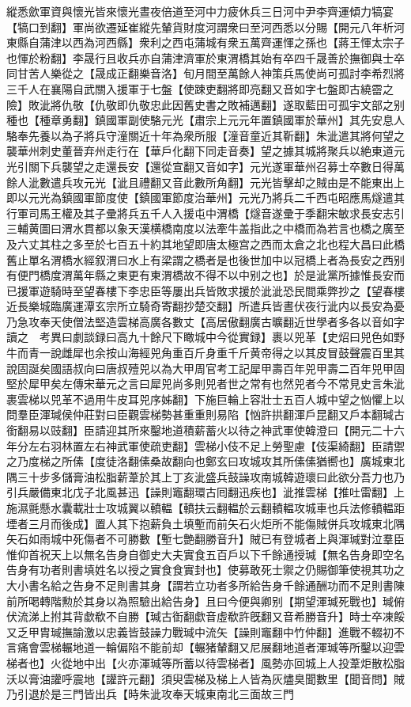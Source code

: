 縱悉歛軍資與懷光皆來懷光晝夜倍道至河中力疲休兵三日河中尹李齊運傾力犒宴【犒口到翻】軍尚欲遷延崔縱先輦貨財度河謂衆曰至河西悉以分賜【開元八年析河東縣自蒲津以西為河西縣】衆利之西屯蒲城有衆五萬齊運惲之孫也【蔣王惲太宗子也惲於粉翻】李晟行且收兵亦自蒲津濟軍於東渭橋其始有卒四千晟善於撫御與士卒同甘苦人樂從之【晟成正翻樂音洛】旬月間至萬餘人神策兵馬使尚可孤討李希烈將三千人在襄陽自武關入援軍于七盤【使踈吏翻將即亮翻又音如字七盤即古繞霤之險】敗泚將仇敬【仇敬即仇敬忠此因舊史書之敗補邁翻】遂取藍田可孤宇文部之别種也【種章勇翻】鎮國軍副使駱元光【肅宗上元元年置鎮國軍於華州】其先安息人駱奉先養以為子將兵守潼關近十年為衆所服【潼音童近其靳翻】朱泚遣其將何望之襲華州刺史董晉弃州走行在【華戶化翻下同走音奏】望之據其城將聚兵以絶東道元光引關下兵襲望之走還長安【還從宣翻又音如字】元光遂軍華州召募士卒數日得萬餘人泚數遣兵攻元光【泚且禮翻又音此數所角翻】元光皆擊却之賊由是不能東出上即以元光為鎮國軍節度使【鎮國軍節度治華州】元光乃將兵二千西屯昭應馬燧遣其行軍司馬王權及其子彚將兵五千人入援屯中渭橋【燧音遂彚于季翻宋敏求長安志引三輔黄圖曰渭水貫都以象天漢横橋南度以法牽牛盖指此之中橋而為若言也橋之廣至及六丈其柱之多至於七百五十約其地望即唐太極宫之西而太倉之北也程大昌曰此橋舊止單名渭橋水經叙渭曰水上有梁謂之橋者是也後世加中以冠橋上者為長安之西别有便門橋度渭萬年縣之東更有東渭橋故不得不以中别之也】於是泚黨所據惟長安而已援軍遊騎時至望春樓下李忠臣等屢出兵皆敗求援於泚泚恐民間乘弊抄之【望春樓近長樂城臨廣運潭玄宗所立騎奇寄翻抄楚交翻】所遣兵皆晝伏夜行泚内以長安為憂乃急攻奉天使僧法堅造雲梯高廣各數丈【高居傲翻廣古曠翻近世學者多各以音如字讀之　考異曰劇談録曰高九十餘尺下瞰城中今從實録】裹以兕革【史炤曰兕色如野牛而青一說雌犀也余按山海經兕角重百斤身重千斤黄帝得之以其皮冒鼓聲震百里其說固誕矣國語叔向曰唐叔殪兕以為大甲周官考工記犀甲壽百年兕甲壽二百年兕甲固堅於犀甲矣左傳宋華元之言曰犀兕尚多則兕者世之常有也然兕者今不常見史言朱泚裹雲梯以兕革不過用牛皮耳兕序姊翻】下施巨輪上容壯士五百人城中望之忷懼上以問羣臣渾瑊侯仲莊對曰臣觀雲梯勢甚重重則易陷【忷許拱翻渾戶昆翻又戶本翻瑊古銜翻易以豉翻】臣請迎其所來鑿地道積薪蓄火以待之神武軍使韓澄曰【開元二十六年分左右羽林置左右神武軍使疏吏翻】雲梯小伎不足上勞聖慮【伎渠綺翻】臣請禦之乃度梯之所傃【度徒洛翻傃桑故翻向也鄭玄曰攻城攻其所傃傃猶嚮也】廣城東北隅三十步多儲膏油松脂薪葦於其上丁亥泚盛兵鼓譟攻南城韓遊瓌曰此欲分吾力也乃引兵嚴備東北戊子北風甚迅【譟則竈翻環古囘翻迅疾也】泚推雲梯【推吐雷翻】上施濕氈懸水囊載壯士攻城翼以轒輼【轒扶云翻輼於云翻轒輼攻城車也兵法修轒輼距堙者三月而後成】置人其下抱薪負土填塹而前矢石火炬所不能傷賊併兵攻城東北隅矢石如雨城中死傷者不可勝數【塹七艶翻勝音升】賊已有登城者上與渾瑊對泣羣臣惟仰首祝天上以無名告身自御史大夫實食五百戶以下千餘通授瑊【無名告身即空名告身有功者則書填姓名以授之實食食實封也】使募敢死士禦之仍賜御筆使視其功之大小書名給之告身不足則書其身【謂若立功者多所給告身千餘通酬功而不足則書陳前所喝轉階勲於其身以為照驗出給告身】且曰今便與卿别【期望渾瑊死戰也】瑊俯伏流涕上拊其背歔欷不自勝【瑊古衘翻歔音虛欷許旣翻又音希勝音升】時士卒凍餒又乏甲胄瑊撫諭激以忠義皆鼓譟力戰瑊中流矢【譟則竈翻中竹仲翻】進戰不輟初不言痛會雲梯輾地道一輪偏陷不能前却【輾猪輦翻又尼展翻地道者渾瑊等所鑿以迎雲梯者也】火從地中出【火亦渾瑊等所蓄以待雲梯者】風勢亦回城上人投葦炬散松脂沃以膏油讙呼震地【讙許元翻】須臾雲梯及梯上人皆為灰燼臭聞數里【聞音問】賊乃引退於是三門皆出兵【時朱泚攻奉天城東南北三面故三門